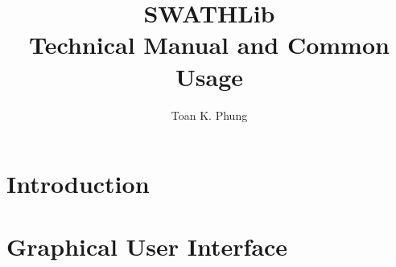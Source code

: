 \documentclass[10pt,a4paper]{memoir}
\title{%
SWATHLib \\
\large Technical Manual and Common Usage}
\author{Toan K. Phung}
\begin{document}
\frontmatter
\maketitle
\clearpage
\tableofcontents
\mainmatter
\chapter{Introduction}


\chapter{Graphical User Interface}

\end{document}
